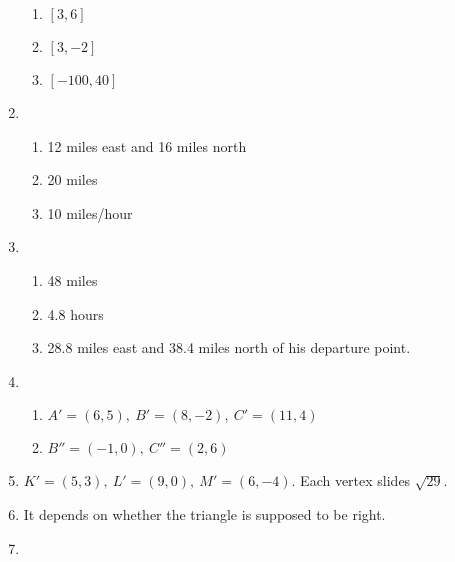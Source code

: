 \documentclass{article}
\begin{document}
\begin{enumerate}
\begin{enumerate}
	\item $[3, 6]$
	
	\item $[3, -2]$
	
	\item $[-100, 40]$
	
	\end{enumerate}
	
\item

	\begin{enumerate}
	
	\item 12 miles east and 16 miles north
	
	\item 20 miles
	
	\item 10 miles/hour
	
	\end{enumerate}
	
\item

	\begin{enumerate}
	
	\item 48 miles
	
	\item 4.8 hours
	
	\item 28.8 miles east and 38.4 miles north of his departure point.
	
	\end{enumerate}
	
\item

	\begin{enumerate}
	
	\item $A' = (6, 5), \ B' = (8, -2), \ C' = (11,4)$
	
	\item $B'' = (-1, 0), \ C'' = (2, 6)$
	
	\end{enumerate}
	
\item $K' = (5, 3), \ L' = (9, 0), \ M' = (6, -4)$. Each vertex slides $\sqrt{29}$.

\item It depends on whether the triangle is supposed to be right.

\item 

	\begin{enumerate}
	

\end{enumerate}
\end{enumerate}
\end{document}
